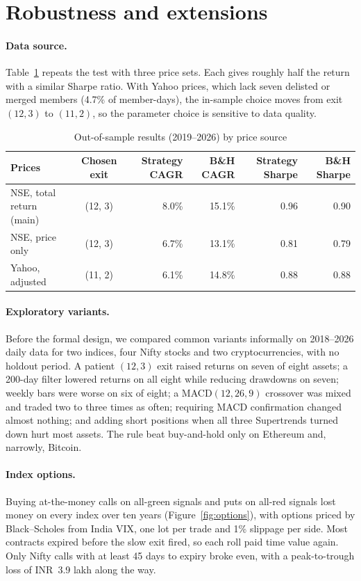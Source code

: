 \documentclass[11pt]{article}
\newcommand{\rupee}{INR~}
\begin{document}
\section{Robustness and extensions}

\paragraph{Data source.} Table~\ref{tab:source} repeats the test with three price sets. Each gives roughly half
the return with a similar Sharpe ratio. With Yahoo prices, which lack seven delisted or merged members (4.7\% of
member-days), the in-sample choice moves from exit $(12,3)$ to $(11,2)$, so the parameter choice is sensitive to
data quality.

\begin{table}[ht]
\centering
\caption{Out-of-sample results (2019--2026) by price source}
\label{tab:source}
\small
\begin{tabular}{lcrrrr}
\toprule
Prices & Chosen exit & Strategy CAGR & B\&H CAGR & Strategy Sharpe & B\&H Sharpe \\
\midrule
NSE, total return (main) & (12, 3) & 8.0\% & 15.1\% & 0.96 & 0.90 \\
NSE, price only & (12, 3) & 6.7\% & 13.1\% & 0.81 & 0.79 \\
Yahoo, adjusted & (11, 2) & 6.1\% & 14.8\% & 0.88 & 0.88 \\
\bottomrule
\end{tabular}
\end{table}

\paragraph{Exploratory variants.} Before the formal design, we compared common variants informally on 2018--2026
daily data for two indices, four Nifty stocks and two cryptocurrencies, with no holdout period. A patient
$(12,3)$ exit raised returns on seven of eight assets; a 200-day filter lowered returns on all eight while reducing
drawdowns on seven; weekly bars were worse on six of eight; a MACD$(12,26,9)$ crossover was mixed and traded two to
three times as often; requiring MACD confirmation changed almost nothing; and adding short positions when all three
Supertrends turned down hurt most assets. The rule beat buy-and-hold only on Ethereum and, narrowly, Bitcoin.

\paragraph{Index options.} Buying at-the-money calls on all-green signals and puts on all-red signals lost money
on every index over ten years (Figure~\ref{fig:options}), with options priced by Black--Scholes from India VIX,
one lot per trade and 1\% slippage per side. Most contracts expired before the slow exit fired, so each roll paid
time value again. Only Nifty calls with at least 45 days to expiry broke even, with a peak-to-trough loss of
\rupee3.9 lakh along the way.
\end{document}

